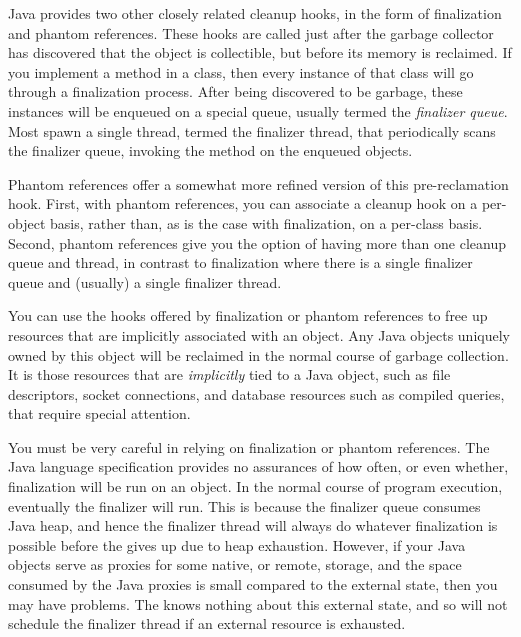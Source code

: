 Java provides two other closely related cleanup hooks, in the form of
finalization and phantom references. These hooks are called just after the
garbage collector has discovered that the object is collectible, but before its
memory is reclaimed. If you implement a  method in a class, then
every instance of that class will go through a finalization process. After being
discovered to be garbage, these instances will be enqueued on a special queue,
usually termed the \emph{finalizer queue}. Most \jres spawn a single thread,
termed the finalizer thread, that periodically scans the finalizer queue,
invoking the  method on the enqueued objects.

Phantom references offer a somewhat more refined version of this pre-reclamation
hook. First, with phantom references, you can associate a cleanup hook on a
per-object basis, rather than, as is the case with finalization, on a per-class
basis. Second, phantom references give you the option of having more than one
cleanup queue and thread, in contrast to finalization where there is a single
finalizer queue and (usually) a single finalizer thread.

You can use the hooks offered by finalization or phantom references to free up
resources that are implicitly associated with an object. Any Java objects
uniquely owned by this object will be reclaimed in the normal course of garbage
collection. It is those resources that are \emph{implicitly} tied to a Java
object, such as file descriptors, socket connections, and database resources such
as compiled queries, that require special attention.

You must be very careful in relying on finalization or phantom references. The
Java language specification provides no assurances of how often, or even whether,
finalization will be run on an object. In the normal course of program execution,
eventually the finalizer will run. This is because the finalizer queue consumes
Java heap, and hence the finalizer thread will always do whatever finalization is
possible before the \jre gives up due to heap exhaustion. However, if your Java
objects serve as proxies for some native, or remote, storage, and the space
consumed by the Java proxies is small compared to the external state, then you
may have problems. The \jre knows nothing about this external state, and so will
not schedule the finalizer thread if an external resource is exhausted.

